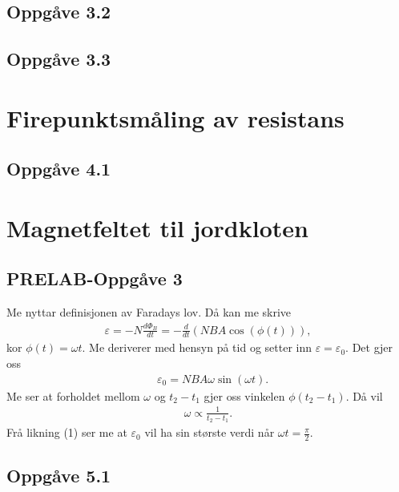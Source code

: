 \documentclass[11pt, a4paper]{article}
\begin{document}
  \subsection*{Oppgåve 3.2}



  \subsection*{Oppgåve 3.3}





\newpage




\section*{Firepunktsmåling av resistans}


  \subsection*{Oppgåve 4.1}




\newpage




\section*{Magnetfeltet til jordkloten}


  \subsection*{PRELAB-Oppgåve 3}
    Me nyttar definisjonen av Faradays lov. Då kan me skrive
    \begin{align*}
      \varepsilon = -N\frac{d\Phi_{B}}{dt} = -\frac{d}{dt}\left( NBA\cos(\phi(t)) \right),
    \end{align*}
    kor $\phi(t) = \omega t$. Me deriverer med hensyn på tid og setter inn $\varepsilon = \varepsilon_0$. Det gjer oss
    \begin{align}
      &\varepsilon_0 = NBA\omega\sin(\omega t).
    \end{align}
    Me ser at forholdet mellom $\omega$ og $t_2 - t_1$ gjer oss vinkelen $\phi(t_2 - t_1)$. Då vil
    \begin{align*}
      \omega \propto \frac{1}{t_2 - t_1}.
    \end{align*}
    Frå likning (1) ser me at $\varepsilon_0$ vil ha sin største verdi når $\omega t = \frac{\pi}{2}$.



  \subsection*{Oppgåve 5.1}
\end{document}

